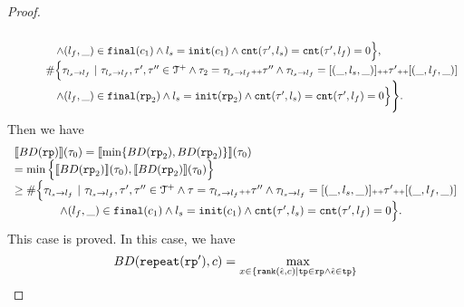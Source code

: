 \begin{proof}
\[\begin{array}{l}
        \\ \qquad \qquad
      \land (l_{f}, \_) \in \mathtt{final}(c_1)
      \land l_s = \mathtt{init}(c_1)
      \land \mathtt{cnt}(\mathtt{\tau}', l_s) = \mathtt{cnt}(\mathtt{\tau}', l_f) = 0 
      \Big\},
      \\ \qquad \quad
      \#
      \Big\{\mathtt{\tau}_{l_s \to l_f} ~\vert~ \mathtt{\tau}_{l_s \to l_f}, \mathtt{\tau}', \mathtt{\tau}''\in \mathcal{T}^{+}
      \land \mathtt{\tau}_2 = \mathtt{\tau}_{l_s \to l_f} {\scriptscriptstyle ++} \mathtt{\tau}''
      \land \mathtt{\tau}_{l_s \to l_f} = [(\_, l_s, \_)] {\scriptscriptstyle ++} \mathtt{\tau}' {\scriptscriptstyle ++} [(\_, l_f, \_)]
       \\ \qquad \qquad
     \land (l_{f}, \_) \in \mathtt{final}(\mathtt{rp}_2)
     \land l_s = \mathtt{init}(\mathtt{rp}_2)
     \land \mathtt{cnt}(\mathtt{\tau}', l_s) = \mathtt{cnt}(\mathtt{\tau}', l_f) = 0 
     \Big\} 
     \Bigg\}.
      \end{array}
    \]
    Then we have
    \[
      \begin{array}{l}
      \llbracket BD(\mathtt{rp}) \rrbracket(\mathtt{\tau}_0) =
      \llbracket \min \{ BD(\mathtt{rp}_2), BD(\mathtt{rp}_2) \} \rrbracket(\mathtt{\tau}_0)
      \\
      = \min \Big\{ \llbracket BD(\mathtt{rp}_2) \rrbracket(\mathtt{\tau}_0), \llbracket BD(\mathtt{rp}_2) \rrbracket(\mathtt{\tau}_0) \Big\}
      \\
      \geq
      \# \Big\{\mathtt{\tau}_{l_s \to l_f} ~\vert~ \mathtt{\tau}_{l_s \to l_f}, \mathtt{\tau}', \mathtt{\tau}''\in \mathcal{T}^{+}
      \land \mathtt{\tau} = \mathtt{\tau}_{l_s \to l_f} {\scriptscriptstyle ++} \mathtt{\tau}''
      \land \mathtt{\tau}_{l_s \to l_f} = [(\_, l_s, \_)] {\scriptscriptstyle ++} \mathtt{\tau}' {\scriptscriptstyle ++} [(\_, l_f, \_)]
      \\ \qquad \qquad
      \land (l_{f}, \_) \in \mathtt{final}(c_1)
      \land l_s = \mathtt{init}(c_1)
      \land \mathtt{cnt}(\mathtt{\tau}', l_s) = \mathtt{cnt}(\mathtt{\tau}', l_f) = 0 
      \Big\}.
        \end{array}
    \]
This case is proved.
In this case, we have
\[
  BD(\rprepeat(\rprog'), c) =
  \max\limits_{x \in \left\{ \locbound(\absevent, c) | \tpath \in \rprog \land \absevent \in \tpath \right\}}
\]
\end{proof}
